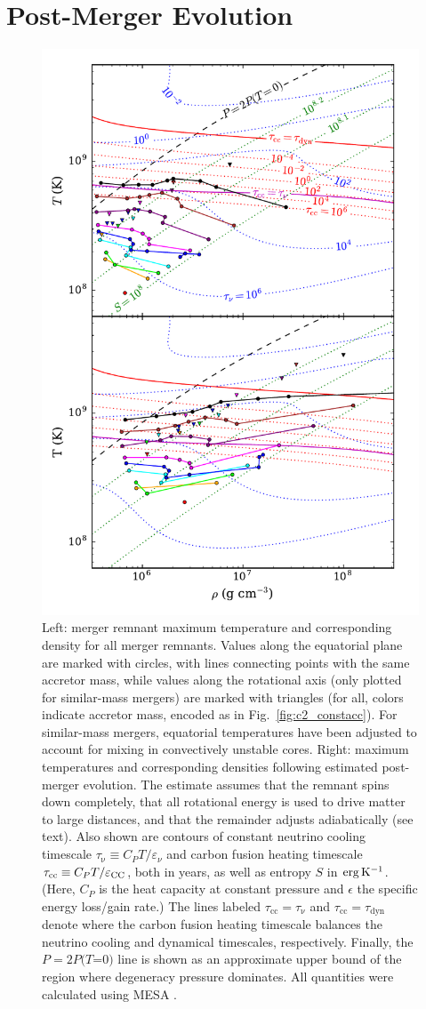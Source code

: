 \section{Post-Merger Evolution}
\label{sec:c2_postmerger}

\begin{figure}
\centering
\includegraphics[angle=0,width=0.7\columnwidth]{chapter2_zhu+13/figures/Willitexplode.pdf}
\caption{Left: merger remnant maximum temperature {\Tmax} and corresponding density {\rhoTmax} for all merger remnants.  Values along the equatorial plane are marked with circles, with lines connecting points with the same accretor mass, while values along the rotational axis (only plotted for similar-mass mergers) are marked with triangles (for all, colors indicate accretor mass, encoded as in Fig.~\ref{fig:c2_constacc}).  For similar-mass mergers, equatorial temperatures have been adjusted to account for mixing in convectively unstable cores.  Right: maximum temperatures and corresponding densities following estimated post-merger evolution.  The estimate assumes that the remnant spins down completely, that all rotational energy is used to drive matter to large distances, and that the remainder adjusts adiabatically (see text).  Also shown are contours of constant neutrino cooling timescale $\tau_\mathrm{\nu}\equiv C_P T/\varepsilon_\nu$ and carbon fusion heating timescale $\tau_\mathrm{cc}\equiv C_P T/\varepsilon_{\rm CC}$, both in years, as well as entropy $S$ in ${\rm erg\,K^{-1}}$.  (Here, $C_P$ is the heat capacity at constant pressure and $\epsilon$ the specific energy loss/gain rate.)  The lines labeled $\tau_\mathrm{cc} = \tau_\mathrm{\nu}$ and $\tau_\mathrm{cc} = \tau_\mathrm{dyn}$ denote where the carbon fusion heating timescale balances the neutrino cooling and dynamical timescales, respectively.  Finally, the $P = 2P(T$=$0)$ line is shown as an approximate upper bound of the region where degeneracy pressure dominates.  All quantities were calculated using MESA \citep{paxt+11}.}

\end{figure}
